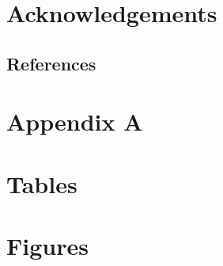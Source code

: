 \documentclass[]{article}
\begin{document}
\hypertarget{acknowledgements}{%
\section*{Acknowledgements}\label{acknowledgements}}

\pagebreak

\hypertarget{references}{%
\subsection*{References}\label{references}}

\hypertarget{refs}{}

\pagebreak

\hypertarget{appendix-a}{%
\section*{Appendix A}\label{appendix-a}}

\hypertarget{tables}{%
\section{Tables}\label{tables}}

\hypertarget{figures}{%
\section{Figures}\label{figures}}
\end{document}
